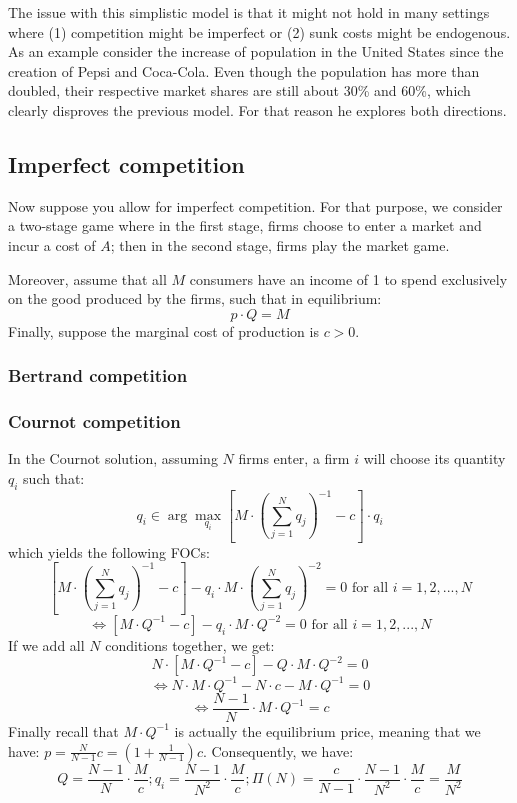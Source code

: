 \documentclass[12pt]{report}
\begin{document}
The issue with this simplistic model is that it might not hold in many settings where (1) competition might be imperfect or (2) sunk costs might be endogenous. As an example consider the increase of population in the United States since the creation of Pepsi and Coca-Cola. Even though the population has more than doubled, their respective market shares are still about 30\% and 60\%, which clearly disproves the previous model. For that reason he explores both directions.

\subsection{Imperfect competition}

Now suppose you allow for imperfect competition. For that purpose, we consider a two-stage game where in the first stage, firms choose to enter a market and incur a cost of $A$; then in the second stage, firms play the market game.

Moreover, assume that all $M$ consumers have an income of 1 to spend exclusively on the good produced by the firms, such that in equilibrium: $$p\cdot Q = M$$
Finally, suppose the marginal cost of production is $c>0$.

\subsubsection{Bertrand competition}



\subsubsection{Cournot competition}

In the Cournot solution, assuming $N$ firms enter, a firm $i$ will choose its quantity $q_i$ such that: $$q_i \in \arg\max_{q_i} \left[M\cdot\left(\sum_{j=1}^{N} q_j\right)^{-1} - c\right]\cdot q_i $$ which yields the following FOCs: $$\left[M\cdot\left(\sum_{j=1}^{N} q_j\right)^{-1} - c\right] - q_i\cdot M \cdot \left(\sum_{j=1}^{N} q_j\right)^{-2} = 0 \text{ for all } i = 1, 2, ..., N $$
$$\Leftrightarrow \left[M\cdot Q^{-1} - c\right] - q_i\cdot M \cdot Q^{-2} = 0 \text{ for all } i = 1, 2, ..., N $$ If we add all $N$ conditions together, we get: $$ N\cdot\left[M\cdot Q^{-1} - c\right] - Q \cdot M \cdot Q^{-2} = 0 $$ $$\Leftrightarrow N \cdot M\cdot Q^{-1} - N \cdot c - M \cdot Q^{-1} = 0 $$ $$\Leftrightarrow \frac{N - 1}{N} \cdot M\cdot Q^{-1} = c $$
Finally recall that $M\cdot Q^{-1}$ is actually the equilibrium price, meaning that we have: $p = \frac{N}{N-1} c = (1 + \frac{1}{N-1})c $. Consequently, we have: $$Q = \frac{N - 1}{N} \cdot \frac{M}{c}; q_i = \frac{N - 1}{N^2} \cdot \frac{M}{c}; \Pi(N) = \frac{c}{N-1}\cdot \frac{N - 1}{N^2} \cdot \frac{M}{c} = \frac{M}{N^2} $$
\end{document}
